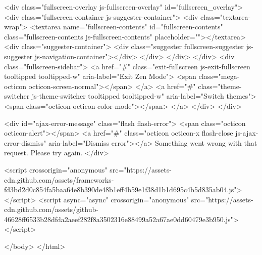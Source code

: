     <div class="fullscreen-overlay js-fullscreen-overlay" id="fullscreen_overlay">
  <div class="fullscreen-container js-suggester-container">
    <div class="textarea-wrap">
      <textarea name="fullscreen-contents" id="fullscreen-contents" class="fullscreen-contents js-fullscreen-contents" placeholder=""></textarea>
      <div class="suggester-container">
        <div class="suggester fullscreen-suggester js-suggester js-navigation-container"></div>
      </div>
    </div>
  </div>
  <div class="fullscreen-sidebar">
    <a href="#" class="exit-fullscreen js-exit-fullscreen tooltipped tooltipped-w" aria-label="Exit Zen Mode">
      <span class="mega-octicon octicon-screen-normal"></span>
    </a>
    <a href="#" class="theme-switcher js-theme-switcher tooltipped tooltipped-w"
      aria-label="Switch themes">
      <span class="octicon octicon-color-mode"></span>
    </a>
  </div>
</div>



    

    <div id="ajax-error-message" class="flash flash-error">
      <span class="octicon octicon-alert"></span>
      <a href="#" class="octicon octicon-x flash-close js-ajax-error-dismiss" aria-label="Dismiss error"></a>
      Something went wrong with that request. Please try again.
    </div>


      <script crossorigin="anonymous" src="https://assets-cdn.github.com/assets/frameworks-fd3bd2d0c854fa5baa64e8b390de48b1eff4b59e1f38d1b1d695c4b5d835ab04.js"></script>
      <script async="async" crossorigin="anonymous" src="https://assets-cdn.github.com/assets/github-46628ff6533b28dfda2aeef282f8a3502316e88499a52a67ae0dd60479e3b950.js"></script>
      
      

  </body>
</html>

